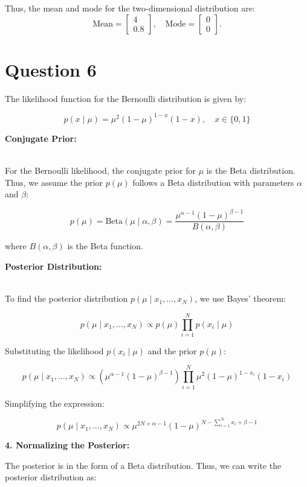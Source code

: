 \documentclass[12pt]{article}
\begin{document}
Thus, the mean and mode for the two-dimensional distribution are:
\[
\text{Mean} = \begin{bmatrix} 4 \\ 0.8 \end{bmatrix}, \quad \text{Mode} = \begin{bmatrix} 0 \\ 0 \end{bmatrix}.
\]

\section*{Question 6}
The likelihood function for the Bernoulli distribution is given by:

\[
p(x \mid \mu) = \mu^2 (1 - \mu)^{1 - x} (1 - x), \quad x \in \{0, 1\}
\]

\textbf{Conjugate Prior:}

\\ For the Bernoulli likelihood, the conjugate prior for \( \mu \) is the Beta distribution. Thus, we assume the prior \( p(\mu) \) follows a Beta distribution with parameters \( \alpha \) and \( \beta \):

\[
p(\mu) = \text{Beta}(\mu \mid \alpha, \beta) = \frac{\mu^{\alpha - 1} (1 - \mu)^{\beta - 1}}{B(\alpha, \beta)}
\]

where \( B(\alpha, \beta) \) is the Beta function.

\textbf{Posterior Distribution:}

\\ To find the posterior distribution \( p(\mu \mid x_1, \dots, x_N) \), we use Bayes' theorem:

\[
p(\mu \mid x_1, \dots, x_N) \propto p(\mu) \prod_{i=1}^{N} p(x_i \mid \mu)
\]

Substituting the likelihood \( p(x_i \mid \mu) \) and the prior \( p(\mu) \):

\[
p(\mu \mid x_1, \dots, x_N) \propto \left( \mu^{\alpha - 1} (1 - \mu)^{\beta - 1} \right) \prod_{i=1}^{N} \mu^2 (1 - \mu)^{1 - x_i} (1 - x_i)
\]

Simplifying the expression:

\[
p(\mu \mid x_1, \dots, x_N) \propto \mu^{2N + \alpha - 1} (1 - \mu)^{N - \sum_{i=1}^{N} x_i + \beta - 1}
\]

\textbf{4. Normalizing the Posterior:}

The posterior is in the form of a Beta distribution. Thus, we can write the posterior distribution as:
\end{document}
